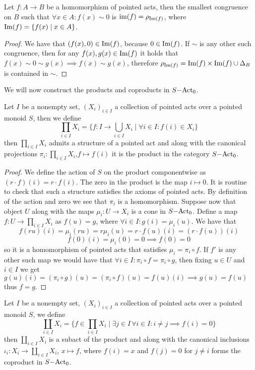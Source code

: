 \begin{proposition}
    Let $f: A \to B$ be a homomorphism of pointed acts, then the smallest congruence on $B$ such that $\forall x\in A :f(x)\sim 0$ is
    $\text{im}(f)=\rho_{\mathrm{Im}(f)}$, where $\mathrm{Im}(f) = \{f(x) \mid x\in A\}$.
\end{proposition}
\begin{proof}
    We have that $(f(x),0)\in\mathrm{Im}(f)$, because $0\in\mathrm{Im}(f)$. If $\sim$ is any other such congruence, then for any $f(x),g(x)\in\mathrm{Im}(f)$
    it holds that $f(x)\sim 0 \sim g(x) \implies f(x)\sim g(x)$, therefore $\rho_{\mathrm{Im}(f)}=\mathrm{Im}(f)\times\mathrm{Im}(f)\cup\Delta_B$ is contained in $\sim$.
\end{proof}
We will now construct the products and coproducts in $S\mathrm{-Act}_0$. 
\begin{proposition}
    Let $I$ be a nonempty set, $(X_i)_{i\in I}$ a collection of pointed acts over a pointed monoid $S$, then we define 
    \[
        \prod_{i\in I}X_i = \{f: I \to\bigcup_{i\in I } X_i \mid\forall i\in I :  f(i)\in X_i \}
    \]
    then $\prod_{i\in I}X_i$ admits a structure of a pointed act and along with the canonical projections 
    $\pi_i : \prod_{i\in I }X_i$,$f\mapsto f(i)$ it is the product in the category $S\mathrm{-Act}_0$.
\end{proposition}
\begin{proof}
    We define the action of $S$ on the product componentwise as $(r\cdot f)(i) = r\cdot f(i)$. The zero in the product 
    is the map $i\mapsto 0$. It is routine to check that such a structure satisfies the 
    axioms of pointed acts. By definition of the action and zero we see that $\pi_i$ is a homomorphism. Suppose now that 
    object $U$ along with the maps $\mu_i : U \to X_i$ is a cone in $S\mathrm{-Act}_0$. Define a map $f: U \to\prod_{i\in I} X_i$ 
    as $f(u) = g$, where $\forall i\in I : g(i) = \mu_i(u)$. We have that 
    \[
        f(ru)(i) = \mu_i(ru) = r\mu_i(u) = r\cdot f(u)(i) = (r\cdot f(u))(i)
    \]  
    \[
        f(0)(i) = \mu_i(0) = 0 \implies f(0) = 0
    \]
    so it is a homomorphism of pointed acts that satisfies $\mu_i = \pi_i\circ f$. If $f'$ is any other such map we would have that 
    $\forall i\in I : \pi_i\circ f = \pi_i\circ g$, then fixing $u\in U$ and $i\in I$ we get $g(u)(i) = (\pi_i \circ g)(u) = (\pi_i\circ f)(u) = f(u)(i) \implies g(u)=f(u)$ 
    thus $f=g$.
\end{proof}
\begin{proposition}
    Let $I$ be a nonempty set, $(X_i)_{i\in I}$ a collection of pointed acts over a pointed monoid $S$, we define 
    \[
        \coprod_{i\in I } X_i = \{f\in\prod_{i\in I }X_i \mid \exists j\in I\,\forall i\in I : i\neq j \implies f(i) = 0\}
    \]
    then $\coprod_{i\in I} X_i$ is a subact of the product and along with the canonical inclusions $\iota_i : X_i \to \coprod_{i\in I} X_i$, $x\mapsto f$, where 
    $f(i) = x$ and $f(j)=0$ for $j\neq i$
    forms the coproduct in $S\mathrm{-Act}_0$.
\end{proposition}
